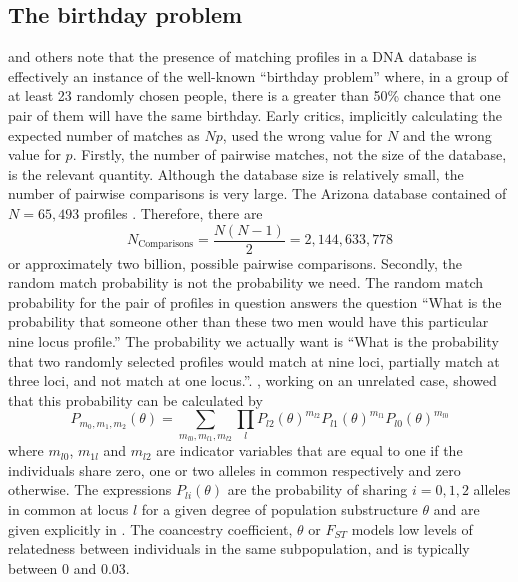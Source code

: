 \documentclass[a4paper,11pt]{article}
\begin{document}
\subsection[The birthday problem]{The birthday problem}
\label{sec:are-numbers-wrong}
\cite{weir2007} and others \citep{brenner2007, curran2007,
  mueller2008, kaye2009} note that the presence of matching profiles
in a DNA database is effectively an instance of the well-known
``birthday problem'' \citep{wiki_birthday} where, in a group of at
least 23 randomly chosen people, there is a greater than 50\% chance
that one pair of them will have the same birthday. Early critics,
implicitly calculating the expected number of matches as $Np$, used
the wrong value for $N$ and the wrong value for $p$. Firstly, the
number of pairwise matches, not the size of the database, is the
relevant quantity. Although the database size is relatively small, the
number of pairwise comparisons is very large. The Arizona database
contained of $N=65,493$ profiles \citep{brenner2007}. Therefore,
there are
\[
N_\text{Comparisons}=\frac{N(N-1)}{2} = 2,144,633,778
\]
or approximately two billion, possible pairwise comparisons.
Secondly, the random match probability is not the probability we need.
The random match probability for the pair of profiles in question
answers the question ``What is the probability that someone other than
these two men would have this particular nine locus profile.'' The
probability we actually want is ``What is the probability that two
randomly selected profiles would match at nine loci, partially match
at three loci, and not match at one locus.''. \cite{weir2004},
working on an unrelated case, showed that this probability can be
calculated by
\begin{equation}
\label{eq:P}
P_{m_{0},m_{1},m_{2}}(\theta) = \sum_{m_{l0},m_{l1},m_{l2}}{\prod_l{P_{l2}(\theta)^{m_{l2}}P_{l1}(\theta)^{m_{l1}}P_{l0}(\theta)^{m_{l0}}}}
\end{equation}
where $m_{l0}$, $m_{1l}$ and $m_{l2}$ are indicator variables that are
equal to one if the individuals share zero, one or two alleles in
common respectively and zero otherwise. The expressions
$P_{li}(\theta)$ are the probability of sharing $i=0,1,2$ alleles in
common at locus $l$ for a given degree of population substructure
$\theta$ and are given explicitly in \cite{weir2004,weir2007}. The
coancestry coefficient, $\theta$ or $F_{ST}$ models low levels of
relatedness between individuals in the same subpopulation, and is
typically between 0 and 0.03.
\end{document}
